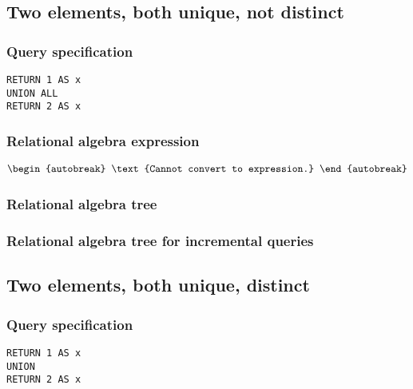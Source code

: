 \subsection{Two elements, both unique, not distinct}

\subsubsection*{Query specification}

\begin{lstlisting}
RETURN 1 AS x
UNION ALL
RETURN 2 AS x
\end{lstlisting}

\subsubsection*{Relational algebra expression}

\begin{align*}
\begin{autobreak}
\text{Cannot convert to expression.}
\end{autobreak}
\end{align*}

\subsubsection*{Relational algebra tree}


\subsubsection*{Relational algebra tree for incremental queries}


\subsection{Two elements, both unique, distinct}

\subsubsection*{Query specification}

\begin{lstlisting}
RETURN 1 AS x
UNION
RETURN 2 AS x
\end{lstlisting}

